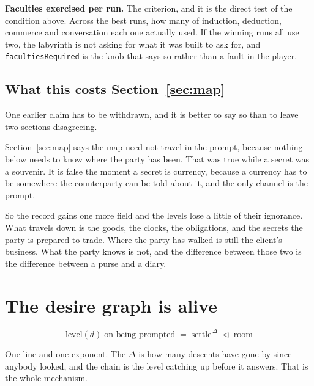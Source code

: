 \documentclass[11pt,a4paper]{article}
\begin{document}
\textbf{Faculties exercised per run.} The criterion, and it is the direct test of the condition
above. Across the best runs, how many of induction, deduction, commerce and conversation each one
actually used. If the winning runs all use two, the labyrinth is not asking for what it was built
to ask for, and \texttt{facultiesRequired} is the knob that says so rather than a fault in the
player.

\subsection{What this costs Section~\ref{sec:map}}

One earlier claim has to be withdrawn, and it is better to say so than to leave two sections
disagreeing.

Section~\ref{sec:map} says the map need not travel in the prompt, because nothing below needs to
know where the party has been. That was true while a secret was a souvenir. It is false the moment
a secret is currency, because a currency has to be somewhere the counterparty can be told about
it, and the only channel is the prompt.

\begin{sectionbox}
So the record gains one more field and the levels lose a little of their ignorance. What travels
down is the goods, the clocks, the obligations, and the secrets the party is prepared to trade.
Where the party has walked is still the client's business. What the party knows is not, and the
difference between those two is the difference between a purse and a diary.
\end{sectionbox}

\newpage

\newpage

\section{The desire graph is alive}
\label{sec:alive}

\begin{center}
\begin{tcolorbox}[plainbg, colback=pale, width=0.86\textwidth]
\[ \text{level}(d) \;\text{on being prompted} \;=\; \text{settle}^{\,\Delta} \;\lhd\; \text{room} \]
\end{tcolorbox}
\end{center}

One line and one exponent. The $\Delta$ is how many descents have gone by since anybody looked, and
the chain is the level catching up before it answers. That is the whole mechanism.
\end{document}
